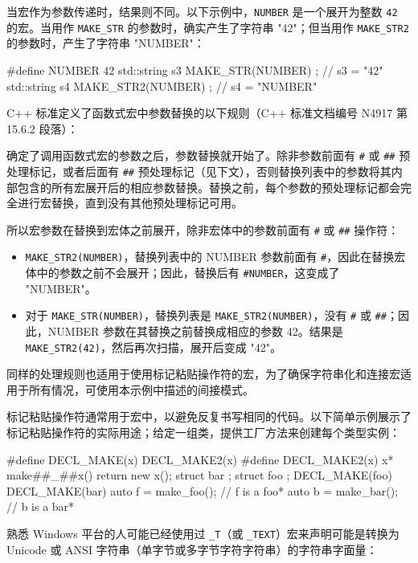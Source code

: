 当宏作为参数传递时，结果则不同。以下示例中，\verb|NUMBER| 是一个展开为整数 \verb|42| 的宏。当用作 \verb|MAKE_STR| 的参数时，确实产生了字符串 "42"；但当用作 \verb|MAKE_STR2| 的参数时，产生了字符串 "NUMBER"：

\begin{cpp}
#define NUMBER 42
std::string s3 { MAKE_STR(NUMBER) };    // s3 = "42"
std::string s4 { MAKE_STR2(NUMBER) };   // s4 = "NUMBER"
\end{cpp}

C++ 标准定义了函数式宏中参数替换的以下规则（C++ 标准文档编号 N4917 第 15.6.2 段落）：

\begin{myTip}
确定了调用函数式宏的参数之后，参数替换就开始了。除非参数前面有 \verb|#| 或 \verb|##| 预处理标记，或者后面有 \verb|##| 预处理标记（见下文），否则替换列表中的参数将其内部包含的所有宏展开后的相应参数替换。替换之前，每个参数的预处理标记都会完全进行宏替换，直到没有其他预处理标记可用。
\end{myTip}

所以宏参数在替换到宏体之前展开，除非宏体中的参数前面有 \verb|#| 或 \verb|##| 操作符：

\begin{itemize}
\item
\verb|MAKE_STR2(NUMBER)|，替换列表中的 NUMBER 参数前面有 \verb|#|，因此在替换宏体中的参数之前不会展开；因此，替换后有 \verb|#NUMBER|，这变成了 "NUMBER"。

\item
对于 \verb|MAKE_STR(NUMBER)|，替换列表是 \verb|MAKE_STR2(NUMBER)|，没有 \verb|#| 或 \verb|##|；因此，NUMBER 参数在其替换之前替换成相应的参数 42。结果是 \verb|MAKE_STR2(42)|，然后再次扫描，展开后变成 "42"。
\end{itemize}

同样的处理规则也适用于使用标记粘贴操作符的宏，为了确保字符串化和连接宏适用于所有情况，可使用本示例中描述的间接模式。

标记粘贴操作符通常用于宏中，以避免反复书写相同的代码。以下简单示例展示了标记粘贴操作符的实际用途；给定一组类，提供工厂方法来创建每个类型实例：

\begin{cpp}
#define DECL_MAKE(x)    DECL_MAKE2(x)
#define DECL_MAKE2(x)   x* make##_##x() { return new x(); }
struct bar {};
struct foo {};
DECL_MAKE(foo)
DECL_MAKE(bar)
auto f = make_foo(); // f is a foo*
auto b = make_bar(); // b is a bar*
\end{cpp}

熟悉 Windows 平台的人可能已经使用过 \verb|_T|（或 \verb|_TEXT|）宏来声明可能是转换为 Unicode 或 ANSI 字符串（单字节或多字节字符字符串）的字符串字面量：

